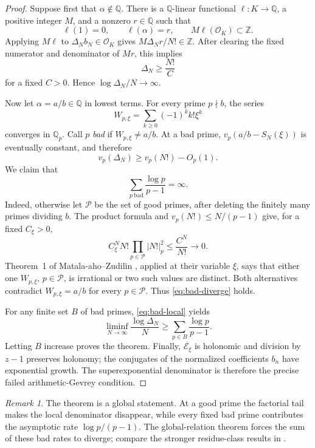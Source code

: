 \documentclass[11pt]{article}
\theoremstyle{definition}
\theoremstyle{remark}
\newtheorem{remark}[theorem]{Remark}
\newcommand{\Q}{\mathbb Q}
\newcommand{\Z}{\mathbb Z}
\newcommand{\Eul}{\mathcal E}
\newcommand{\OO}{\mathcal O}
\begin{document}
\begin{proof}
Suppose first that \(\alpha\notin\Q\).  There is a \(\Q\)-linear functional
\(\ell:K\to\Q\), a positive integer \(M\), and a nonzero \(r\in\Q\) such that
\[
 \ell(1)=0,\qquad \ell(\alpha)=r,\qquad
 M\ell(\OO_K)\subset\Z.
\]
Applying \(M\ell\) to \(\Delta_Nb_N\in\OO_K\) gives
\(M\Delta_Nr/N!\in\Z\).  After clearing the fixed numerator and denominator
of \(Mr\), this implies
\[
 \Delta_N\ge \frac{N!}{C}
\]
for a fixed \(C>0\).  Hence \(\log\Delta_N/N\to\infty\).

Now let \(\alpha=a/b\in\Q\) in lowest terms.  For every prime \(p\nmid b\),
the series
\[
 W_{p,\xi}=\sum_{k\ge0}(-1)^kk!\xi^k
\]
converges in \(\Q_p\).  Call \(p\) \emph{bad} if
\(W_{p,\xi}\ne a/b\).  At a bad prime,
\(v_p(a/b-S_N(\xi))\) is eventually constant, and therefore
\begin{equation}\label{eq:bad-local}
 v_p(\Delta_N)\ge v_p(N!)-O_p(1).
\end{equation}
We claim that
\begin{equation}\label{eq:bad-diverge}
 \sum_{p\ \mathrm{bad}}\frac{\log p}{p-1}=\infty.
\end{equation}
Indeed, otherwise let \(\mathcal P\) be the set of good primes, after deleting
the finitely many primes dividing \(b\).  The product formula and
\(v_p(N!)\le N/(p-1)\) give, for a fixed \(C_\xi>0\),
\[
 C_\xi^N N!\prod_{p\in\mathcal P}|N!|_p^2
 \le \frac{C^N}{N!}\longrightarrow0.
\]
Theorem~1 of Matala-aho--Zudilin \cite{MZ2018}, applied at their variable
\(\xi\), says that either one \(W_{p,\xi}\), \(p\in\mathcal P\), is
irrational or two such values are distinct.  Both alternatives contradict
\(W_{p,\xi}=a/b\) for every \(p\in\mathcal P\).  Thus
\eqref{eq:bad-diverge} holds.

For any finite set \(B\) of bad primes, \eqref{eq:bad-local} yields
\[
 \liminf_{N\to\infty}\frac{\log\Delta_N}{N}
 \ge \sum_{p\in B}\frac{\log p}{p-1}.
\]
Letting \(B\) increase proves the theorem.  Finally,
\(\Eul_\xi\) is holonomic and division by \(z-1\) preserves holonomy; the
conjugates of the normalized coefficients \(b_n\) have exponential growth.
The superexponential denominator is therefore the precise failed
arithmetic-Gevrey condition.
\end{proof}

\begin{remark}
The theorem is a global statement.  At a good prime the factorial tail makes
the local denominator disappear, while every fixed bad prime contributes the
asymptotic rate \(\log p/(p-1)\).  The global-relation theorem forces the sum
of these bad rates to diverge; compare the stronger residue-class results in
\cite{EMHS2019}.
\end{remark}
\end{document}
